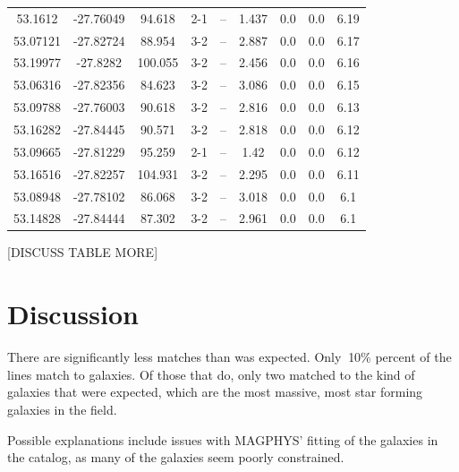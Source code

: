\begin{table}
\begin{tabular}{ccccccccc}
53.1612 & -27.76049 & 94.618 & 2-1 & -- & 1.437 & 0.0 & 0.0 & 6.19 \\
53.07121 & -27.82724 & 88.954 & 3-2 & -- & 2.887 & 0.0 & 0.0 & 6.17 \\
53.19977 & -27.8282 & 100.055 & 3-2 & -- & 2.456 & 0.0 & 0.0 & 6.16 \\
53.06316 & -27.82356 & 84.623 & 3-2 & -- & 3.086 & 0.0 & 0.0 & 6.15 \\
53.09788 & -27.76003 & 90.618 & 3-2 & -- & 2.816 & 0.0 & 0.0 & 6.13 \\
53.16282 & -27.84445 & 90.571 & 3-2 & -- & 2.818 & 0.0 & 0.0 & 6.12 \\
53.09665 & -27.81229 & 95.259 & 2-1 & -- & 1.42 & 0.0 & 0.0 & 6.12 \\
53.16516 & -27.82257 & 104.931 & 3-2 & -- & 2.295 & 0.0 & 0.0 & 6.11 \\
53.08948 & -27.78102 & 86.068 & 3-2 & -- & 3.018 & 0.0 & 0.0 & 6.1 \\
53.14828 & -27.84444 & 87.302 & 3-2 & -- & 2.961 & 0.0 & 0.0 & 6.1 \\
\end{tabular}
\end{table}\label{table:Catalog}

[DISCUSS TABLE MORE]


\section{Discussion}

There are significantly less matches than was expected. Only $~$10\% percent of the lines match to galaxies. Of those that do, only two matched to the kind of galaxies that were expected, which are the most massive, most star forming galaxies in the field. 

Possible explanations include issues with MAGPHYS' fitting of the galaxies in the catalog, as many of the galaxies seem poorly constrained. 